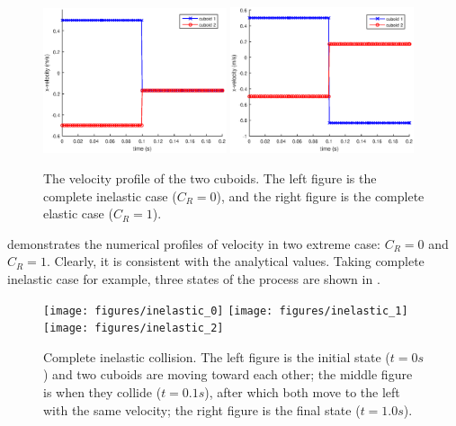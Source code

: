 \begin{figure}[!ht]
\centering
\includegraphics[width=0.48\textwidth]{figures/inelastic}
\includegraphics[width=0.48\textwidth]{figures/elastic}
\caption{The velocity profile of the two cuboids. The left figure is the
complete inelastic case ($C_R = 0$), and the right figure is the complete
elastic case ($C_R = 1$).}
\label{fig:rg_collsn_velo}
\end{figure}

 demonstrates the numerical profiles of
velocity in two extreme case: $C_R = 0$ and $C_R = 1$.
Clearly, it is consistent with the analytical values.
Taking complete inelastic case for example, three states of the process are
shown in .
\begin{figure}[!ht]
\centering
\texttt{[image: figures/inelastic\_0]}
\texttt{[image: figures/inelastic\_1]}
\texttt{[image: figures/inelastic\_2]}
\caption{Complete inelastic collision. The left figure is the initial
state ($t = 0s$) and two cuboids are moving toward each other; the middle
figure is when they collide ($t = 0.1s$), after which both move to the left
with the same velocity; the right figure is the final state ($t = 1.0s$).}
\label{fig:inelastic_collsn}
\end{figure}

